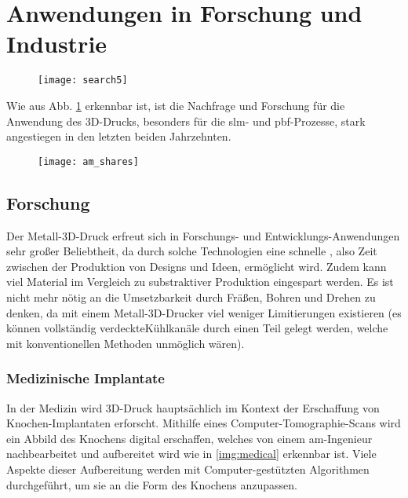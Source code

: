 \documentclass[../main.tex]{subfiles}
\begin{document}
\section{Anwendungen in Forschung und Industrie}
\begin{figure}[H]
	\centering
	\texttt{[image: search5]}
	\label{img:search_5}
\end{figure}
Wie aus Abb. \ref{img:search_5} erkennbar ist, ist die Nachfrage und Forschung für die Anwendung des 3D-Drucks, besonders für die \acrlong{slm}- und \acrfull{pbf}-Prozesse, stark angestiegen in den letzten beiden Jahrzehnten.

\begin{figure}[H]
	\centering
	\texttt{[image: am\_shares]}
	\label{img:am_shares}
\end{figure} 
\subsection{Forschung}
Der Metall-3D-Druck erfreut sich in Forschungs- und Entwicklungs-Anwendungen sehr großer Beliebtheit, da durch solche Technologien eine schnelle , also Zeit zwischen der Produktion von Designs und Ideen, ermöglicht wird. Zudem kann viel Material im Vergleich zu substraktiver Produktion eingespart werden. Es ist nicht mehr nötig an die Umsetzbarkeit durch Fräßen, Bohren und Drehen zu denken, da mit einem Metall-3D-Drucker viel weniger Limitierungen existieren (es können vollständig verdeckteKühlkanäle durch einen Teil gelegt werden, welche mit konventionellen Methoden unmöglich wären).
\subsubsection*{Medizinische Implantate}
In der Medizin wird 3D-Druck hauptsächlich im Kontext der Erschaffung von Knochen-Implantaten erforscht. Mithilfe eines Computer-Tomographie-Scans wird ein Abbild des Knochens digital erschaffen, welches von einem \acrshort{am}-Ingenieur nachbearbeitet und aufbereitet wird wie in \ref{img:medical} erkennbar ist. Viele Aspekte dieser Aufbereitung werden mit Computer-gestützten Algorithmen durchgeführt, um sie an die Form des Knochens anzupassen.\parencite{doi:10.1146/annurev-bioeng-082020-032402}
\end{document}
